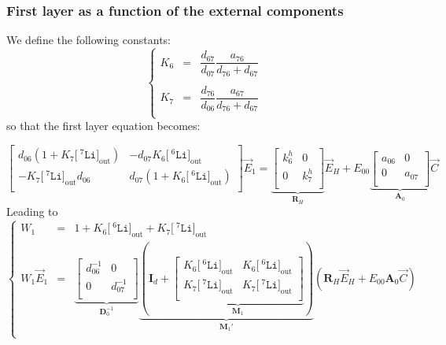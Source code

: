 \documentclass[aps,onecolumn,11pt]{revtex4}
\newcommand{\mychem}[1]{\mathtt{#1}}
\newcommand{\myconc}[1]{\big[#1\big]}
\newcommand{\spLi}[1]{{\!~^{#1}\mychem{Li}}}
\newcommand{\Li}[1]{\myconc{\spLi{#1}}}
\newcommand{\myout}[1]{{#1}_{\mathrm{out}}}
\newcommand{\LiOut}[1]{\myout{\Li{#1}}}
\newcommand{\mymat}[1]{{\bm{#1}}}
\begin{document}
\subsubsection{First layer as a function of the external components}
We define the following constants:
\begin{equation}
\left\lbrace
\begin{array}{rcl}
K_6 & = & \dfrac{d_{67}}{d_{07}}\dfrac{a_{76}}{d_{76}+d_{67}} \\
\\
K_7 & = &  \dfrac{d_{76}}{d_{06}}\dfrac{a_{67}}{d_{76}+d_{67}}\\
\end{array}
\right.
\end{equation}
so that the first layer equation becomes:
	
\begin{equation}
\begin{bmatrix}
d_{06} \left(1+ K_7\LiOut{7}\right) & -d_{07}K_6\LiOut{6}\\
-K_7\LiOut{7}d_{06} & d_{07}\left(1 + K_6\LiOut{6}\right) \\
\end{bmatrix}
\vec{E}_1 = \underbrace{
\begin{bmatrix}
	k^h_6 & 0 \\
	0     & k^h_7\\
\end{bmatrix}
}_{\mymat{R}_H}
\vec{E}_H 
+ E_{00}
\underbrace{
\begin{bmatrix}
a_{06} & 0 \\
0 & a_{07} \\
\end{bmatrix}
}_{\mymat{A}_0}
\vec{C}
\end{equation}
Leading to
\begin{equation}
\left\lbrace
\begin{array}{rcl}
W_1 & = & 1 +    K_6\LiOut{6} +  K_7 \LiOut{7}  \\
W_1 \vec{E}_1 & = & \underbrace{
\begin{bmatrix}
d_{06}^{-1} & 0 \\
0 & d_{07}^{-1} \\
\end{bmatrix}
}_{\mymat{D}_0^{-1}}
\underbrace{
\left(
\mymat{I}_d+
\underbrace{
	\begin{bmatrix}
	K_6\LiOut{6} & K_6\LiOut{6}\\
	K_7\LiOut{7} & K_7 \LiOut{7}\\
	\end{bmatrix}
	}_{\mymat{M}_1}
		\right)}_{\mymat{M}_1'}
	\left( 
	\mymat{R}_H \vec{E}_H + E_{00} \mymat{A}_0 \vec{C}
	\right)
	\\
\end{array}
\right.
\end{equation}
\end{document}
